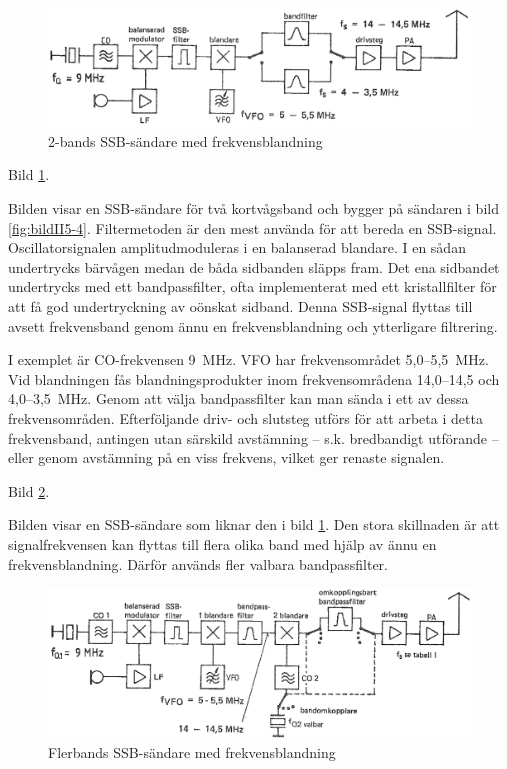 \begin{figure}
  \includegraphics[width=\textwidth]{images/cropped_pdfs/bild_2_5-05.pdf}
  \caption{2-bands SSB-sändare med frekvensblandning}
  \label{fig:bildII5-5}
\end{figure}

Bild \ref{fig:bildII5-5}.

Bilden visar en SSB-sändare för två kortvågsband och bygger på
sändaren i bild \ref{fig:bildII5-4}.
Filtermetoden är den mest använda för att bereda en SSB-signal.
Oscillatorsignalen amplitudmoduleras i en balanserad blandare.
I en sådan undertrycks bärvågen medan de båda sidbanden släpps fram.
Det ena sidbandet undertrycks med ett bandpassfilter, ofta implementerat med
ett kristallfilter för att få god undertryckning av oönskat sidband.
Denna SSB-signal flyttas till avsett frekvensband
genom ännu en frekvensblandning och ytterligare filtrering.

I exemplet är CO-frekvensen 9~MHz. VFO har frekvensområdet 5,0--5,5~MHz.
Vid blandningen fås blandningsprodukter inom frekvensområdena
14,0--14,5 och 4,0--3,5~MHz. Genom att välja bandpassfilter kan man
sända i ett av dessa frekvensområden. Efterföljande driv- och
slutsteg utförs för att arbeta i detta frekvensband, antingen utan
särskild avstämning -- s.k. bredbandigt utförande -- eller genom
avstämning på en viss frekvens, vilket ger renaste signalen.

Bild \ref{fig:bildII5-6}.

Bilden visar en SSB-sändare som liknar den i bild \ref{fig:bildII5-5}. Den stora
skillnaden är att signalfrekvensen kan flyttas till flera olika band
med hjälp av ännu en frekvensblandning. Därför används fler valbara
bandpassfilter.

\begin{figure}
  \includegraphics[width=\textwidth]{images/cropped_pdfs/bild_2_5-06.pdf}
  \caption{Flerbands SSB-sändare med frekvensblandning}
  \label{fig:bildII5-6}
\end{figure}

